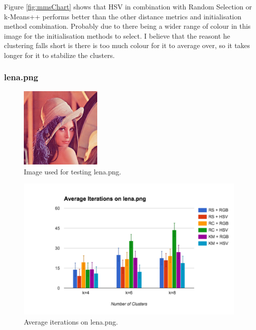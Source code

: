 \documentclass{article}
\begin{document}
Figure \ref{fig:mmsChart} shows that HSV in combination with Random Selection or
k-Means++ performs better than the other distance metrics and initialisation
method combination. Probably due to there being a wider range of colour in this
image for the initialisation methods to select. I believe that the reasont he
clustering falls short is there is too much colour for it to average over, so it
takes longer for it to stabilize the clusters.

\subsubsection{lena.png}

\begin{figure}[ht]
\begin{center}
\includegraphics[width=0.35\textwidth]{images/lena}
\caption{Image used for testing lena.png.}
\label{fig:lenaTest}
\end{center}
\end{figure}

\begin{figure}[ht]
\begin{center}
\includegraphics[width=1\textwidth]{images/lenaChart}
\caption{Average iterations on lena.png.}
\label{fig:lenaChart}
\end{center}
\end{figure}
\end{document}
